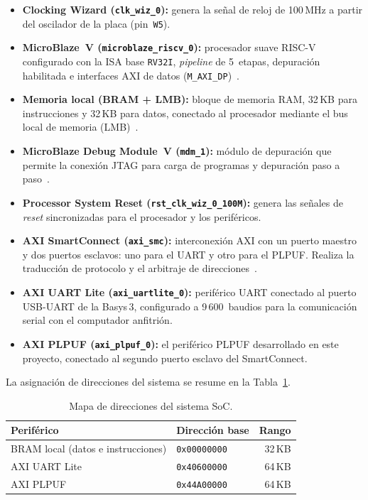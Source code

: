 \begin{itemize}
  \item \textbf{Clocking Wizard (\texttt{clk\_wiz\_0}):} genera la señal de
    reloj de 100\,MHz a partir del oscilador de la placa (pin~\texttt{W5}).

  \item \textbf{MicroBlaze~V (\texttt{microblaze\_riscv\_0}):} procesador
    suave RISC-V configurado con la ISA base \texttt{RV32I}, \textit{pipeline} de 5~etapas,
    depuración habilitada e interfaces AXI de datos
    (\texttt{M\_AXI\_DP})~\cite{ug1629}.

  \item \textbf{Memoria local (BRAM + LMB):} bloque de memoria RAM, 32\,KB para instrucciones y 32\,KB para datos, conectado al
    procesador mediante el bus local de memoria (LMB)~\cite{ug1711}.

  \item \textbf{MicroBlaze Debug Module~V (\texttt{mdm\_1}):} módulo de
    depuración que permite la conexión JTAG para carga de programas y
    depuración paso a paso~\cite{ug1629}.

  \item \textbf{Processor System Reset (\texttt{rst\_clk\_wiz\_0\_100M}):}
    genera las señales de \textit{reset} sincronizadas para el procesador y
    los periféricos.

  \item \textbf{AXI SmartConnect (\texttt{axi\_smc}):} interconexión AXI con
    un puerto maestro y dos puertos esclavos: uno para el UART y otro para el
    PLPUF. Realiza la traducción de protocolo y el arbitraje de
    direcciones~\cite{ug1037}.

  \item \textbf{AXI UART Lite (\texttt{axi\_uartlite\_0}):} periférico UART
    conectado al puerto USB-UART de la Basys\,3, configurado a 9\,600~baudios
    para la comunicación serial con el computador anfitrión.

  \item \textbf{AXI PLPUF (\texttt{axi\_plpuf\_0}):} el periférico PLPUF
    desarrollado en este proyecto, conectado al segundo puerto esclavo del
    SmartConnect.
\end{itemize}

La asignación de direcciones del sistema se resume en la
Tabla~\ref{tab:addrmap}.

\begin{table}[htbp]
\centering
\caption{Mapa de direcciones del sistema SoC.}
\label{tab:addrmap}
\begin{tabular}{llr}
\hline
\textbf{Periférico} & \textbf{Dirección base} & \textbf{Rango} \\
\hline
BRAM local (datos e instrucciones) & \texttt{0x00000000} & 32\,KB \\
AXI UART Lite                      & \texttt{0x40600000} & 64\,KB \\
AXI PLPUF                          & \texttt{0x44A00000} & 64\,KB \\
\hline
\end{tabular}
\end{table}


